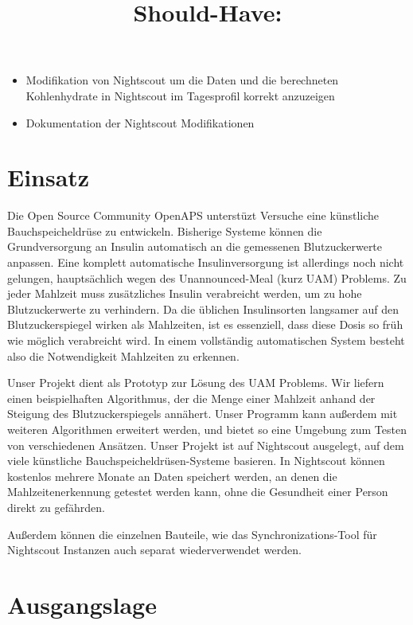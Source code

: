 \documentclass[accentcolor=tud0b,12pt,paper=a4]{tudreport}
\begin{document}
\title{\textbf{Should-Have:}}

\begin{itemize}	
	\item Modifikation von Nightscout um die Daten und die berechneten Kohlenhydrate in Nightscout im Tagesprofil korrekt anzuzeigen
\item Dokumentation der Nightscout Modifikationen
\end{itemize}

	
 	\chapter{Einsatz}
	
	Die Open Source Community OpenAPS unterstüzt Versuche eine künstliche Bauchspeicheldrüse zu entwickeln. Bisherige Systeme können die Grundversorgung an Insulin automatisch an die gemessenen Blutzuckerwerte anpassen. Eine komplett automatische Insulinversorgung ist allerdings noch nicht gelungen, hauptsächlich wegen des Unannounced-Meal (kurz UAM) Problems. Zu jeder Mahlzeit muss zusätzliches Insulin verabreicht werden, um zu hohe Blutzuckerwerte zu verhindern. Da die üblichen Insulinsorten langsamer auf den Blutzuckerspiegel wirken als Mahlzeiten, ist es essenziell, dass diese Dosis so früh wie möglich verabreicht wird. In einem vollständig automatischen System besteht also die Notwendigkeit Mahlzeiten zu erkennen.
	
	Unser Projekt dient als Prototyp zur Lösung des UAM Problems. Wir liefern einen beispielhaften Algorithmus, der die Menge einer Mahlzeit anhand der Steigung des Blutzuckerspiegels annähert. Unser Programm kann außerdem mit weiteren Algorithmen erweitert werden, und bietet so eine Umgebung zum Testen von verschiedenen Ansätzen. Unser Projekt ist auf Nightscout ausgelegt, auf dem viele künstliche Bauchspeicheldrüsen-Systeme basieren. In Nightscout können kostenlos mehrere Monate an Daten speichert werden, an denen die Mahlzeitenerkennung getestet werden kann, ohne die Gesundheit einer Person direkt zu gefährden. 
	
	Außerdem können die einzelnen Bauteile, wie das Synchronizations-Tool für Nightscout Instanzen auch separat wiederverwendet werden.

		
{\let\clearpage\relax	\chapter{Ausgangslage}}
\end{document}
